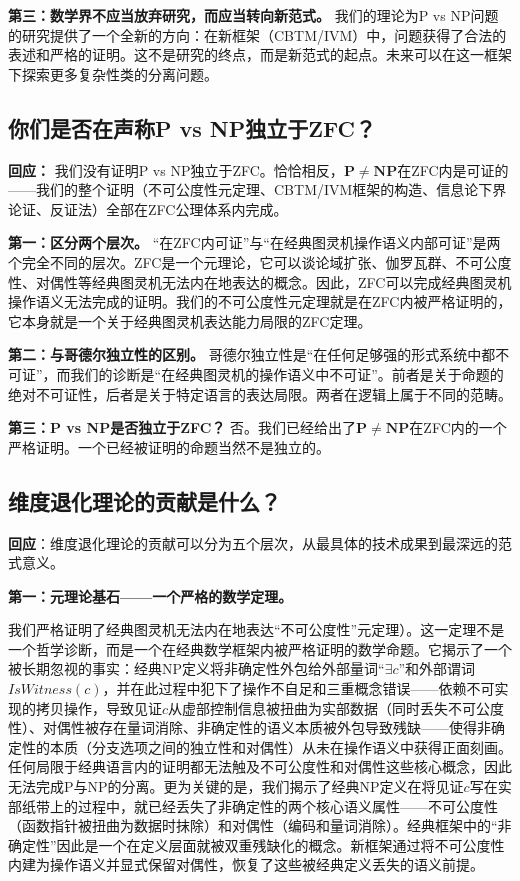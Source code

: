 \documentclass{ctexart}
\begin{document}
	\textbf{第三：数学界不应当放弃研究，而应当转向新范式。} 我们的理论为P vs NP问题的研究提供了一个全新的方向：在新框架（CBTM/IVM）中，问题获得了合法的表述和严格的证明。这不是研究的终点，而是新范式的起点。未来可以在这一框架下探索更多复杂性类的分离问题。
	
	
	\subsection{你们是否在声称P vs NP独立于ZFC？}
	
	\textbf{回应：} 我们没有证明P vs NP独立于ZFC。恰恰相反，$\mathbf{P}\neq\mathbf{NP}$在ZFC内是可证的——我们的整个证明（不可公度性元定理、CBTM/IVM框架的构造、信息论下界论证、反证法）全部在ZFC公理体系内完成。
	
	\textbf{第一：区分两个层次。} ``在ZFC内可证''与``在经典图灵机操作语义内部可证''是两个完全不同的层次。ZFC是一个元理论，它可以谈论域扩张、伽罗瓦群、不可公度性、对偶性等经典图灵机无法内在地表达的概念。因此，ZFC可以完成经典图灵机操作语义无法完成的证明。我们的不可公度性元定理就是在ZFC内被严格证明的，它本身就是一个关于经典图灵机表达能力局限的ZFC定理。
	
	\textbf{第二：与哥德尔独立性的区别。} 哥德尔独立性是``在任何足够强的形式系统中都不可证''，而我们的诊断是``在经典图灵机的操作语义中不可证''。前者是关于命题的绝对不可证性，后者是关于特定语言的表达局限。两者在逻辑上属于不同的范畴。
	
	\textbf{第三：P vs NP是否独立于ZFC？} 否。我们已经给出了$\mathbf{P}\neq\mathbf{NP}$在ZFC内的一个严格证明。一个已经被证明的命题当然不是独立的。
	
	
	\subsection{维度退化理论的贡献是什么？}
	
	\textbf{回应}：维度退化理论的贡献可以分为五个层次，从最具体的技术成果到最深远的范式意义。
	
	\textbf{第一：元理论基石——一个严格的数学定理。}
	
	我们严格证明了经典图灵机无法内在地表达``不可公度性''元定理\cite{philo2026, models2026}）。这一定理不是一个哲学诊断，而是一个在经典数学框架内被严格证明的数学命题。它揭示了一个被长期忽视的事实：经典NP定义将非确定性外包给外部量词``$\exists c$''和外部谓词$IsWitness(c)$，并在此过程中犯下了操作不自足和三重概念错误——依赖不可实现的拷贝操作，导致见证$c$从虚部控制信息被扭曲为实部数据（同时丢失不可公度性）、对偶性被存在量词消除、非确定性的语义本质被外包导致残缺——使得非确定性的本质（分支选项之间的独立性和对偶性）从未在操作语义中获得正面刻画。任何局限于经典语言内的证明都无法触及不可公度性和对偶性这些核心概念，因此无法完成P与NP的分离。更为关键的是，我们揭示了经典NP定义在将见证$c$写在实部纸带上的过程中，就已经丢失了非确定性的两个核心语义属性——不可公度性（函数指针被扭曲为数据时抹除）和对偶性（编码和量词消除）。经典框架中的``非确定性''因此是一个在定义层面就被双重残缺化的概念。新框架通过将不可公度性内建为操作语义并显式保留对偶性，恢复了这些被经典定义丢失的语义前提。
	
\end{document}
